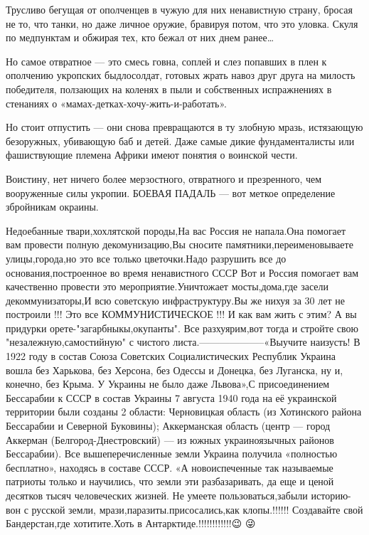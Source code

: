 Трусливо бегущая от ополченцев в чужую для них ненавистную страну, бросая не
то, что танки, но даже личное оружие, бравируя потом, что это уловка. Скуля по
медпунктам и обжирая тех, кто бежал от них днем ранее…

Но самое отвратное — это смесь говна, соплей и слез попавших в плен к ополчению
укропских быдлосолдат, готовых жрать навоз друг друга на милость победителя,
ползающих на коленях в пыли и собственных испражнениях в стенаниях о
«мамах-детках-хочу-жить-и-работать».

Но стоит отпустить — они снова превращаются в ту злобную мразь, истязающую
безоружных, убивающую баб и детей. Даже самые дикие фундаменталисты или
фашиствующие племена Африки имеют понятия о воинской чести.

Воистину, нет ничего более мерзостного, отвратного и презренного, чем
вооруженные силы укропии. БОЕВАЯ ПАДАЛЬ — вот меткое определение збройникам
окраины.


Недоебанные твари,хохлятской породы,На вас Россия не напала.Она помогает вам
провести полную декомунизацию,Вы сносите памятники,переименовываете
улицы,города,но это все только цветочки.Надо разрушить все до
основания,построенное во время ненавистного СССР Вот и Россия помогает вам
качественно провести это мероприятие.Уничтожает мосты,дома,где засели
декоммунизаторы,И всю советскую инфраструктуру.Вы же нихуя за 30 лет не
построили !!! Это все КОММУНИСТИЧЕСКОЕ !!! И как вам жить с этим? А вы придурки
орете-"загарбныкы,окупанты". Все разхуярим,вот тогда и стройте свою
"незалежную,самостийную" с чистого листа.--------------------«Выучите наизусть!
В 1922 году в состав Союза Советских Социалистических Республик Украина вошла
без Харькова, без Херсона, без Одессы и Донецка, без Луганска, ну и, конечно,
без Крыма. У Украины не было даже Львова»,С присоединением Бессарабии к СССР в
состав Украины 7 августа 1940 года на её украинской территории были созданы 2
области: Черновицкая область (из Хотинского района Бессарабии и Северной
Буковины); Аккерманская область (центр — город Аккерман (Белгород-Днестровский)
— из южных украиноязычных районов Бессарабии). Все вышеперечисленные земли
Украина получила «полностью бесплатно», находясь в составе СССР. «А
новоиспеченные так называемые патриоты только и научились, что земли эти
разбазаривать, да еще и ценой десятков тысяч человеческих жизней. Не умеете
пользоваться,забыли историю-вон с русской земли, мрази,паразиты.присосались,как
клопы.!!!!!! Создавайте свой Бандерстан,где хотитите.Хоть в
Антарктиде.!!!!!!!!!!!!😉 😜

